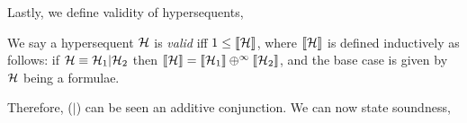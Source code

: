 

\begin{comment}
\begin{lemma}[Monotoncity of Bunches]
    \label[lemma]{MonotonicityOfBunches}
    If $\sequentPDL{\AssumsEnv'_1}{\AssumsEnv'_2}$ is valid, then 
    $\sequentPDL{\AssumsEnv(\AssumsEnv'_1)}{\AssumsEnv(\AssumsEnv'_2)}$ is 
    valid.
\end{lemma}
\begin{proposition}[Bunch Semantics are Lax Linear]
\label{Bunch Semantics are Lax Linear}
\,
\begin{lemma}
    \item If $1 \leq \m{\AssumsEnv_1}_a$, then 
    $\m{\AssumsEnv(\AssumsEnv_1,\AssumsEnv_2 )}_a \leq 
    \m{\AssumsEnv_1, \AssumsEnv(\AssumsEnv_2)}_a$.
    
    \item If $1 \leq \m{\AssumsEnv_1}_c$, then 
    $\m{\AssumsEnv(\AssumsEnv_1,\AssumsEnv_2 )}_c \leq 
    \m{\AssumsEnv_1, \AssumsEnv(\AssumsEnv_2)}_c$.
    
    \item If $\m{\AssumsEnv_1}_a \leq \m{\AssumsEnv_1}_c$ and 
    $\m{\AssumsEnv_2}_a \leq \m{\AssumsEnv_2}_c$, then 
    $\m{\AssumsEnv(\AssumsEnv_1,\AssumsEnv_2 )}_a \leq 
    \m{\AssumsEnv_1, \AssumsEnv(\AssumsEnv_2)}_c$.
\end{lemma}
\end{proposition}
\begin{lemma}[Lax Linearity of Bunches]
\label[lemma]{BunchesAreLaxLinear}
    If $\AssumsEnv_1 \not \equiv \emptyset_{+}$ 
    and $\AssumsEnv_2 \not \equiv \emptyset_{+}$ then 
    ${\sequentPDL{\AssumsEnv(\AssumsEnv_1,\AssumsEnv_2)}
    {\AssumsEnv_1,\AssumsEnv(\AssumsEnv_2)}}$ is valid.
\end{lemma}
\end{comment}



Lastly, we define validity of hypersequents, 

\begin{definition}
    We say a hypersequent $\mathcal{H}$ is \emph{valid} iff $1 \leq \llbracket \mathcal{H}{} \rrbracket$, where $\llbracket \mathcal{H}{} \rrbracket$ is defined inductively as follows: if $\mathcal{H} \equiv \mathcal{H}{}_1 | \mathcal{H}{}_2$ then $\llbracket \mathcal{H} \rrbracket = \llbracket \mathcal{H}{}_1 \rrbracket \oplus^{\infty} \llbracket \mathcal{H}{}_2 \rrbracket$, and the base case is given by $\mathcal{H}$ being a formulae.
\end{definition}

Therefore, ($|$) can be seen an additive conjunction. We can now state soundness,

